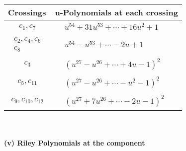 \documentclass[1p]{elsarticle_modified}
\theoremstyle{definition}
\begin{document}
\begin{tabular}{m{50pt}|m{274pt}}
Crossings & \hspace{64pt}u-Polynomials at each crossing \\
\hline $$\begin{aligned}c_{1},c_{7}\end{aligned}$$&$\begin{aligned}
&u^{54}+31 u^{53}+\cdots+16 u^2+1
\end{aligned}$\\
\hline $$\begin{aligned}c_{2},c_{4},c_{6}\\c_{8}\end{aligned}$$&$\begin{aligned}
&u^{54}- u^{53}+\cdots-2 u+1
\end{aligned}$\\
\hline $$\begin{aligned}c_{3}\end{aligned}$$&$\begin{aligned}
&(u^{27}- u^{26}+\cdots+4 u-1)^{2}
\end{aligned}$\\
\hline $$\begin{aligned}c_{5},c_{11}\end{aligned}$$&$\begin{aligned}
&(u^{27}- u^{26}+\cdots- u^2-1)^{2}
\end{aligned}$\\
\hline $$\begin{aligned}c_{9},c_{10},c_{12}\end{aligned}$$&$\begin{aligned}
&(u^{27}+7 u^{26}+\cdots-2 u-1)^{2}
\end{aligned}$\\
\hline
\end{tabular}\\~\\
\newpage\renewcommand{\arraystretch}{1}
\flushleft \textbf{(v) Riley Polynomials at the component}\newline \\
\end{document}
